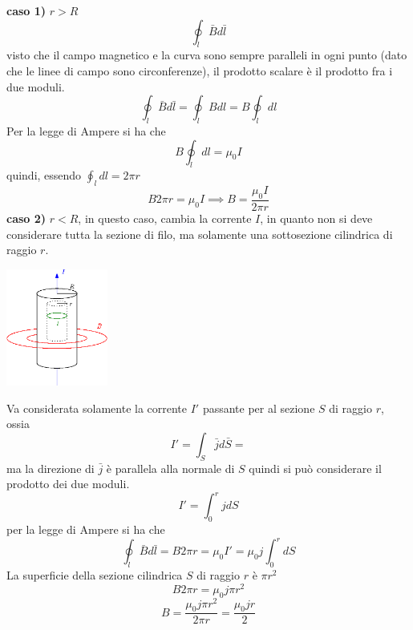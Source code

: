 \documentclass[10pt, letterpaper]{report}
\begin{document}
\textbf{caso 1)} $r>R$ 
$$ \oint_l \bar B d\bar l  $$
visto che il campo magnetico  e la curva sono sempre paralleli in ogni punto (dato che le linee di campo sono circonferenze), il prodotto scalare è il prodotto fra i due moduli.
$$ \oint_l \bar B d\bar l  =\oint_l Bdl=B\oint_l dl$$
Per la legge di Ampere si ha che 
$$ B\oint_l dl=\mu_0I$$
quindi, essendo $\oint_l dl=2\pi r$
$$B2\pi r = \mu_0I\implies B = \frac{\mu_0I}{2\pi r} $$
\textbf{caso 2)} $r<R$, in questo caso, cambia la corrente $I$, in quanto non si deve considerare tutta la sezione di filo, ma solamente una sottosezione cilindrica di raggio $r$.
\begin{center}
    \includegraphics[width=0.25\textwidth ]{images/cilindroElettrico2.eps}
\end{center}
Va considerata solamente la corrente $I'$ passante per al sezione $S$ di raggio $r$, ossia $$I'=\int_S \bar j d\bar S =$$ 
ma la direzione di $\bar j$ è parallela alla normale di $S$ quindi si può considerare il prodotto dei due moduli.
$$ I'=\int_0^r jdS$$ per la legge di Ampere si ha che 
$$\oint_l \bar B d\bar l = B2\pi r = \mu_0 I' =  \mu_0 j\int_0^r dS$$
La superficie della sezione cilindrica $S$ di raggio $r$ è $\pi r^2$
$$B2\pi r=\mu_0j\pi r^2 $$
$$ B=\frac{\mu_0j\pi r^2}{2\pi r}=\frac{\mu_0j r}{2 }$$
\end{document}
